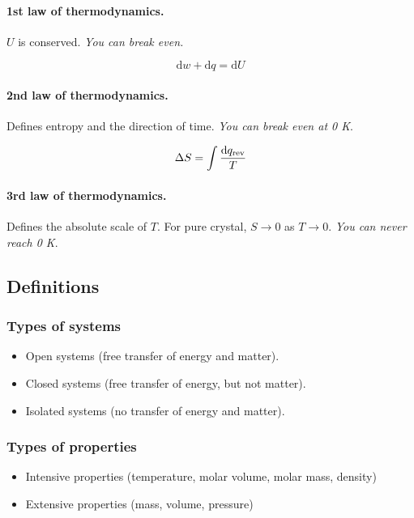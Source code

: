\documentclass{article}
\numberwithin{theorem}{section}
\numberwithin{corollary}{section}
\numberwithin{postulate}{section}
\numberwithin{lemma}{section}
\numberwithin{definition}{section}
\begin{document}
\paragraph{1st law of thermodynamics.} $U$ is conserved. \textit{You can break
even.}

\begin{equation}
  \mathrm{d}w + \mathrm{d}q = \mathrm{d}U
\end{equation}

\paragraph{2nd law of thermodynamics.} Defines entropy and the direction of
time. \textit{You can break even at 0 K}.

\begin{equation}
  \Delta S = \int \frac{\textnormal{d} q_{\mathrm{rev}}}{T}
\end{equation}

\paragraph{3rd law of thermodynamics.} Defines the absolute scale of $T$. For
pure crystal, $S \rightarrow 0$ as $T \rightarrow 0$. \textit{You can never
reach 0 K}.

\subsection{Definitions}

\subsubsection{Types of systems}
\begin{itemize}
  \item Open systems (free transfer of energy and matter).
  \item Closed systems (free transfer of energy, but not matter).
  \item Isolated systems (no transfer of energy and matter).
\end{itemize}

\subsubsection{Types of properties}
\begin{itemize}
  \item{Intensive properties (temperature, molar volume, molar mass, density)}
  \item{Extensive properties (mass, volume, pressure)}
\end{itemize}
\end{document}
